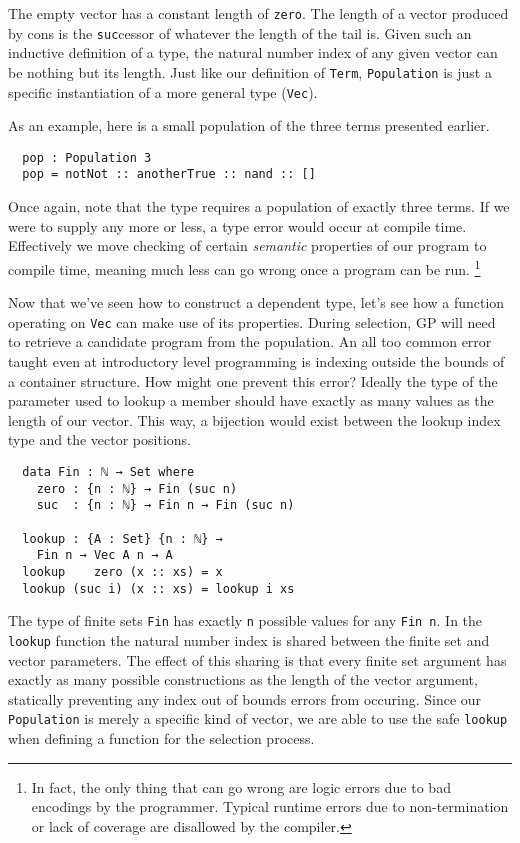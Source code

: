 \documentclass[runningheads,a4paper]{llncs}
\begin{document}
The empty vector has a constant length of \texttt{zero}. The length of a vector
produced by cons is the \texttt{suc}cessor of whatever the length of
the tail is. Given such an inductive definition of a type, the natural
number index of any given vector can be nothing but its length. Just
like our definition of \texttt{Term}, \texttt{Population} is just a
specific instantiation of a more general type (\texttt{Vec}).

As an example, here is a small population of the three terms presented
earlier.

\begin{verbatim}
  pop : Population 3
  pop = notNot :: anotherTrue :: nand :: []
\end{verbatim}

Once again, note that the type requires a population of exactly three
terms. If we were to supply any more or less, a type error would occur at
compile time. Effectively we move checking of certain \textit{semantic}
properties of our program to compile time, meaning much less can go
wrong once a program can be run.
\footnote{In fact, the only thing
  that can go wrong are logic errors due to bad encodings by the
  programmer. Typical runtime errors due to non-termination or lack of
  coverage are disallowed by the compiler.}

Now that we've seen how to construct a dependent type, let's see how
a function operating on \texttt{Vec} can make use of its properties.
During selection, GP will need to retrieve a candidate program from
the population. An all too common error taught even at introductory
level programming is indexing outside the bounds of a container
structure. How might one prevent this error? Ideally the type of the
parameter used to lookup a member should have exactly as many values
as the length of our vector. This way, a bijection would exist between
the lookup index type and the vector positions.

\begin{verbatim}
  data Fin : ℕ → Set where
    zero : {n : ℕ} → Fin (suc n)
    suc  : {n : ℕ} → Fin n → Fin (suc n)

  lookup : {A : Set} {n : ℕ} →
    Fin n → Vec A n → A
  lookup    zero (x :: xs) = x
  lookup (suc i) (x :: xs) = lookup i xs
\end{verbatim}

The type of finite sets \texttt{Fin} has exactly \texttt{n} possible
values for any \texttt{Fin n}. In the \texttt{lookup} function the
natural number index is shared between the finite set and vector
parameters. The effect of this sharing is that every finite set
argument has exactly as many possible constructions as the length of
the vector argument, statically preventing any index out of bounds
errors from occuring. Since our \texttt{Population} is merely a
specific kind of vector, we are able to use the safe \texttt{lookup}
when defining a function for the selection process.
\end{document}
